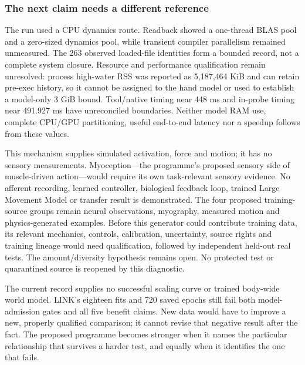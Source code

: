 \subsubsection{The next claim needs a different reference}

The run used a CPU dynamics route. Readback showed a one-thread BLAS pool and a zero-sized dynamics pool, while transient compiler parallelism remained unmeasured. The 263 observed loaded-file identities form a bounded record, not a complete system closure. Resource and performance qualification remain unresolved: process high-water RSS was reported as 5,187,464 KiB and can retain pre-exec history, so it cannot be assigned to the hand model or used to establish a model-only 3 GiB bound. Tool/native timing near 448 ms and in-probe timing near 491.927 ms have unreconciled boundaries. Neither model RAM use, complete CPU/GPU partitioning, useful end-to-end latency nor a speedup follows from these values.

This mechanism supplies simulated activation, force and motion; it has no sensory measurements. Myoception---the programme's proposed sensory side of muscle-driven action---would require its own task-relevant sensory evidence. No afferent recording, learned controller, biological feedback loop, trained Large Movement Model or transfer result is demonstrated. The four proposed training-source groups remain neural observations, myography, measured motion and physics-generated examples. Before this generator could contribute training data, its relevant mechanics, controls, calibration, uncertainty, source rights and training lineage would need qualification, followed by independent held-out real tests. The amount/diversity hypothesis remains open. No protected test or quarantined source is reopened by this diagnostic.

The current record supplies no successful scaling curve or trained body-wide world model. LINK's eighteen fits and 720 saved epochs still fail both model-admission gates and all five benefit claims. New data would have to improve a new, properly qualified comparison; it cannot revise that negative result after the fact. The proposed programme becomes stronger when it names the particular relationship that survives a harder test, and equally when it identifies the one that fails.
